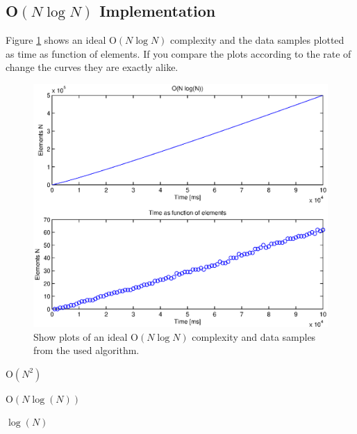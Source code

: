 \subsection{O\(\left( N\log {N }  \right) \) Implementation}
Figure \ref{fig:test2} shows an ideal O\(\left( N\log {N }  \right) \) complexity and the data samples plotted as time as function of elements. If you compare the plots according to the rate of change the curves they are exactly alike. 
\begin{figure}[th!]
\centering
\includegraphics[width=1\textwidth]{./graphics/test2.eps}
\caption{Show plots of an ideal O\(\left( N\log {N }  \right) \) complexity and data samples from the used algorithm.}
\label{fig:test2}
\end{figure}



O\(\left( { N }^{ 2 } \right)\)

O\(\left( N\log {(N)}  \right) \)

\( \log {(N)} \)
